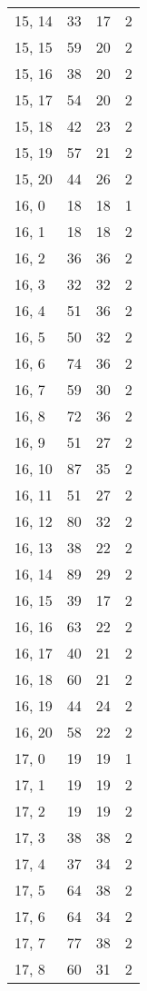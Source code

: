 \begin{table}
\begin{tabular}{llll}
15, 14 &   33 &   17 &     2 \\
15, 15 &   59 &   20 &     2 \\
15, 16 &   38 &   20 &     2 \\
15, 17 &   54 &   20 &     2 \\
15, 18 &   42 &   23 &     2 \\
15, 19 &   57 &   21 &     2 \\
15, 20 &   44 &   26 &     2 \\
16, 0  &   18 &   18 &     1 \\
16, 1  &   18 &   18 &     2 \\
16, 2  &   36 &   36 &     2 \\
16, 3  &   32 &   32 &     2 \\
16, 4  &   51 &   36 &     2 \\
16, 5  &   50 &   32 &     2 \\
16, 6  &   74 &   36 &     2 \\
16, 7  &   59 &   30 &     2 \\
16, 8  &   72 &   36 &     2 \\
16, 9  &   51 &   27 &     2 \\
16, 10 &   87 &   35 &     2 \\
16, 11 &   51 &   27 &     2 \\
16, 12 &   80 &   32 &     2 \\
16, 13 &   38 &   22 &     2 \\
16, 14 &   89 &   29 &     2 \\
16, 15 &   39 &   17 &     2 \\
16, 16 &   63 &   22 &     2 \\
16, 17 &   40 &   21 &     2 \\
16, 18 &   60 &   21 &     2 \\
16, 19 &   44 &   24 &     2 \\
16, 20 &   58 &   22 &     2 \\
17, 0  &   19 &   19 &     1 \\
17, 1  &   19 &   19 &     2 \\
17, 2  &   19 &   19 &     2 \\
17, 3  &   38 &   38 &     2 \\
17, 4  &   37 &   34 &     2 \\
17, 5  &   64 &   38 &     2 \\
17, 6  &   64 &   34 &     2 \\
17, 7  &   77 &   38 &     2 \\
17, 8  &   60 &   31 &     2 \\

\end{tabular}
\end{table}
